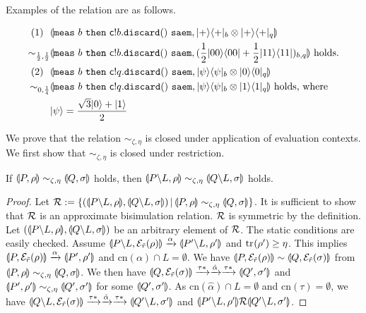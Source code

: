 Examples of the relation are as follows.
\begin{ex}
\label{par:ex1}
  \begin{align*}
   (1)~~&\llparenthesis {\tt meas}~b~{\tt then}~\mathsf{c}! b.\mathtt{discard(}  \mathtt{)}~{\tt saem}, |+\rangle\langle +|_b \otimes |+\rangle\langle +|_q \rrparenthesis\\
   \sim_{\frac{1}{2}, \frac{1}{2}}
   &\llparenthesis {\tt meas}~b~{\tt then}~\mathsf{c}! b.\mathtt{discard(}  \mathtt{)}~{\tt saem}, (\frac{1}{2}|00\rangle\langle 00| +
   \frac{1}{2}|11\rangle\langle 11|)_{b,q} \rrparenthesis \mbox{ holds.}\\
   (2)~~&\llparenthesis {\tt meas}~b~{\tt then}~\mathsf{c}! q.\mathtt{discard(}  \mathtt{)}~{\tt saem}, |\psi\rangle\langle \psi|_b \otimes |0\rangle\langle 0|_q \rrparenthesis\\
   \sim_{0, \frac{1}{4}}
   &\llparenthesis {\tt meas}~b~{\tt then}~\mathsf{c}! q.\mathtt{discard(}  \mathtt{)}~{\tt saem}, |\psi\rangle\langle \psi|_b \otimes |1\rangle\langle 1|_q \rrparenthesis \mbox{ holds,
   where}\\
   & |\psi\rangle = \frac{\sqrt{3}|0\rangle + |1\rangle}{2}
  \end{align*}
\end{ex}
We prove that the relation $\sim_{\zeta, \eta}$ is
closed under application of evaluation contexts.
We first show that $\sim_{\zeta, \eta}$ is
closed under restriction.
\begin{lem}
\label{par:resclosed}
 If $\llparenthesis P, \rho \rrparenthesis \sim_{\zeta, \eta} \llparenthesis Q, \sigma \rrparenthesis$ holds, then
 $\llparenthesis P \backslash L, \rho \rrparenthesis \sim_{\zeta, \eta}
 \llparenthesis Q \backslash L, \sigma \rrparenthesis$ holds.
\end{lem}
\begin{proof}
\label{par:resclosed}
 Let $\mathcal{R} := \{(\llparenthesis P \backslash L, \rho \rrparenthesis, \llparenthesis Q \backslash
 L, \sigma \rrparenthesis) \,|\, \llparenthesis P, \rho \rrparenthesis \sim_{\zeta, \eta} \llparenthesis Q, \sigma \rrparenthesis\}$.
 It is
 sufficient to show that $\mathcal{R}$ is an approximate bisimulation relation.
 $\mathcal{R}$ is symmetric by the definition.
 Let $(\llparenthesis P \backslash L, \rho \rrparenthesis, \llparenthesis Q \backslash
 L, \sigma \rrparenthesis)$ be an arbitrary element of $\mathcal{R}$. The
 static conditions are easily checked. Assume $\llparenthesis P \backslash
 L, \mathcal{E}_{\tilde r}(\rho) \rrparenthesis \xrightarrow{\alpha} \llparenthesis P' \backslash
 L, \rho' \rrparenthesis$ and ${\rm tr}_{}(\rho') \ge \eta$.
 This implies $\llparenthesis P, \mathcal{E}_{\tilde r}(\rho) \rrparenthesis \xrightarrow{\alpha}
 \llparenthesis P', \rho' \rrparenthesis$ and $\mathrm{cn}(\alpha) \cap L = \emptyset$.
 We have
 $\llparenthesis P, \mathcal{E}_{\tilde r}(\rho) \rrparenthesis \sim \llparenthesis Q, \mathcal{E}_{\tilde r}(\sigma) \rrparenthesis$
 from $\llparenthesis P, \rho \rrparenthesis \sim_{\zeta, \eta} \llparenthesis Q, \sigma \rrparenthesis$. We then have 
 $\llparenthesis Q, \mathcal{E}_{\tilde r}(\sigma) \rrparenthesis \xrightarrow{\tau*} \xrightarrow{\hat \alpha} \xrightarrow{\tau*} \llparenthesis Q', \sigma' \rrparenthesis$ 
 and $\llparenthesis P', \rho' \rrparenthesis \sim_{\zeta, \eta} \llparenthesis Q', \sigma' \rrparenthesis$ for some
 $\llparenthesis Q', \sigma' \rrparenthesis$. As $\mathrm{cn}(\hat \alpha) \cap L = \emptyset$
 and $\mathrm{cn}(\tau) = \emptyset$, we have 
 $\llparenthesis Q \backslash L, \mathcal{E}_{\tilde r}(\sigma) \rrparenthesis \xrightarrow{\tau*} \xrightarrow{\hat \alpha} \xrightarrow{\tau*}
 \llparenthesis Q' \backslash L, \sigma' \rrparenthesis$ and 
 $\llparenthesis P' \backslash L, \rho' \rrparenthesis \mathcal{R} \llparenthesis Q' \backslash L, \sigma' \rrparenthesis$. 
\end{proof}


